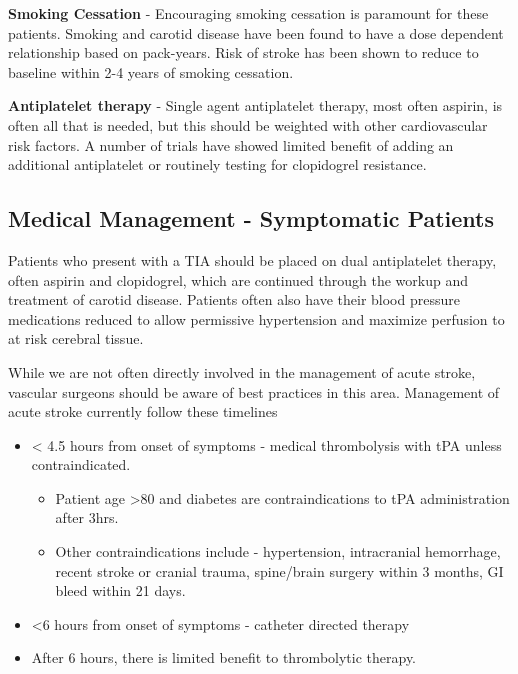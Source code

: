 \documentclass[
]{book}
\providecommand{\tightlist}{%
  \setlength{\itemsep}{0pt}\setlength{\parskip}{0pt}}
\begin{document}
\textbf{Smoking Cessation} - Encouraging smoking cessation is paramount for
these patients. Smoking and carotid disease have been found to have a
dose dependent relationship based on pack-years. Risk of stroke has been
shown to reduce to baseline within 2-4 years of smoking
cessation.\citep{hicks2015, kawachi1993, petrik1995, wilson1997}

\textbf{Antiplatelet therapy} - Single agent antiplatelet therapy, most often
aspirin, is often all that is needed, but this should be weighted with
other cardiovascular risk factors. A number of trials have showed
limited benefit of adding an additional antiplatelet or routinely
testing for clopidogrel resistance.\citep{ricotta}

\hypertarget{medical-management---symptomatic-patients}{%
\subsection{Medical Management - Symptomatic Patients}\label{medical-management---symptomatic-patients}}

Patients who present with a TIA should be placed on dual antiplatelet
therapy, often aspirin and clopidogrel, which are continued through the
workup and treatment of carotid disease. Patients often also have their
blood pressure medications reduced to allow permissive hypertension and
maximize perfusion to at risk cerebral tissue.

While we are not often directly involved in the management of acute
stroke, vascular surgeons should be aware of best practices in this
area. Management of acute stroke currently follow these
timelines\citep{powers2018GuidelinesEarly2018}

\begin{itemize}
\item
  \textless{} 4.5 hours from onset of symptoms - medical thrombolysis with tPA
  unless contraindicated.

  \begin{itemize}
  \tightlist
  \item
    Patient age \textgreater80 and diabetes are contraindications to tPA
    administration after 3hrs.
  \item
    Other contraindications include - hypertension, intracranial
    hemorrhage, recent stroke or cranial trauma, spine/brain surgery
    within 3 months, GI bleed within 21 days.
  \end{itemize}
\item
  \textless6 hours from onset of symptoms - catheter directed therapy
\item
  After 6 hours, there is limited benefit to thrombolytic therapy.
\end{itemize}
\end{document}
